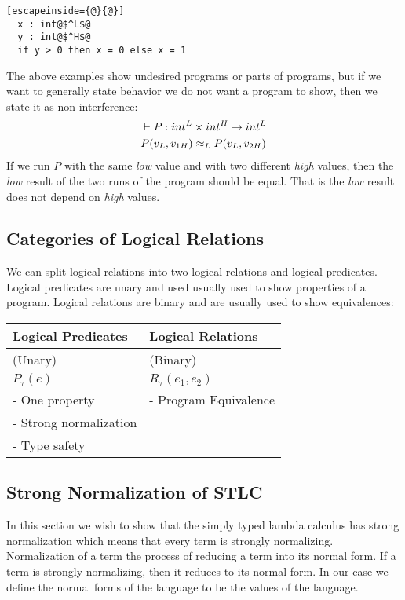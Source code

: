 \begin{itemize}
\begin{itemize}
        \begin{lstlisting}[escapeinside={@}{@}]
  x : int@$^L$@
  y : int@$^H$@
  if y > 0 then x = 0 else x = 1
        \end{lstlisting}
The above examples show undesired programs or parts of programs, but if we want to generally state behavior we do not want a program to show, then we state it as non-interference:
\begin{align*}
  & \vdash P :  int^L \times int^H \rightarrow int^L \\
  & P(v_L,v_{1H}) \approx_L P(v_L,v_{2H})
\end{align*}
If we run $P$ with the same \emph{low} value and with two different \emph{high} values, then the \emph{low} result of the two runs of the program should be equal. That is the \emph{low} result does not depend on \emph{high} values.
  \end{itemize}
\end{itemize}
\subsection*{Categories of Logical Relations}
We can split logical relations into two logical relations and logical predicates. Logical predicates are unary and used usually used to show properties of a program. Logical relations are binary and are usually used to show equivalences:\\
\begin{tabular}{l | l}
  Logical Predicates     & Logical Relations    \\
\hline
  (Unary)                & (Binary)             \\
  $P_\tau(e)$             & $R_\tau(e_1,e_2)$     \\
  - One property         & - Program Equivalence\\ %
  - Strong normalization & \\
  - Type safety          & \\
\end{tabular}
\subsection*{Strong Normalization of STLC}
In this section we wish to show that the simply typed lambda calculus has strong normalization which means that every term is strongly normalizing. Normalization of a term the process of reducing a term into its normal form. If a term is strongly normalizing, then it reduces to its normal form. In our case we define the normal forms of the language to be the values of the language.
